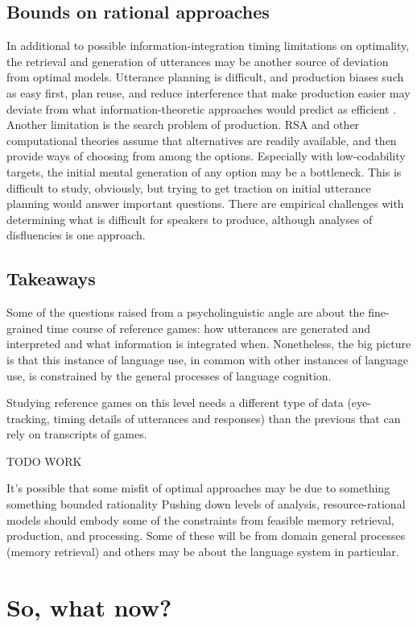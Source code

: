 \documentclass[]{article}
\begin{document}
\subsection{Bounds on rational approaches}
In additional to possible information-integration timing limitations on optimality, the retrieval and generation of utterances may be another source of deviation from optimal models. Utterance planning is difficult, and production biases such as easy first, plan reuse, and reduce interference that make production easier may deviate from what information-theoretic approaches would predict as efficient \cite{macdonald2013}.
Another limitation is the search problem of production. RSA and other computational theories assume that alternatives are readily available, and then provide ways of choosing from among the options. Especially with low-codability targets, the initial mental generation of any option may be a bottleneck. This is difficult to study, obviously, but trying to get traction on initial utterance planning would answer important questions. 
There are empirical challenges with determining what is difficult for speakers to produce, although analyses of disfluencies \cite{yoon2014} is one approach. 

\subsection{Takeaways}

Some of the questions raised from a psycholinguistic angle are about the fine-grained time course of reference games: how utterances are generated and interpreted and what information is integrated when. Nonetheless, the big picture is that this instance of language use, in common with other instances of language use, is constrained by the general processes of language cognition.

Studying reference games on this level needs a different type of data (eye-tracking, timing details of utterances and responses) than the previous that can rely on transcripts of games. 

TODO WORK

It's possible that some misfit of optimal approaches may be due to something something bounded rationality
Pushing down levels of analysis, resource-rational models should embody some of the constraints from feasible memory retrieval, production, and processing. Some of these will be from domain general processes (memory retrieval) and others may be about the language system in particular. 
	\section{So, what now?}
\end{document}
